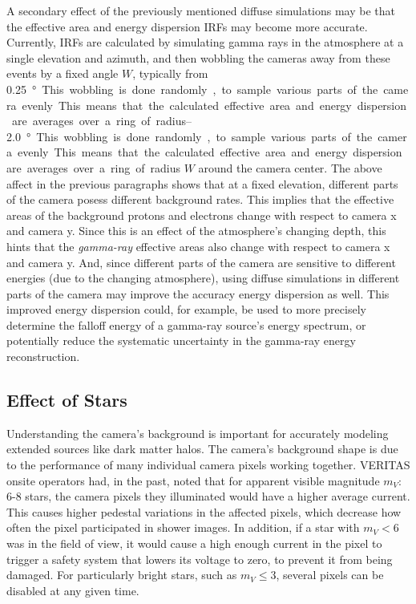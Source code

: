     A secondary effect of the previously mentioned diffuse simulations may be that the effective area and energy dispersion IRFs may become more accurate.
    Currently, IRFs are calculated by simulating gamma rays in the atmosphere at a single elevation and azimuth, and then wobbling the cameras away from these events by a fixed angle $W$, typically from \SIrange{0.25}{2.0}\degree.
    This wobbling is done randomly, to sample various parts of the camera evenly.
    This means that the calculated effective area and energy dispersion are averages over a ring of radius $W$ around the camera center.
    The above affect in the previous paragraphs shows that at a fixed elevation, different parts of the camera posess different background rates.
    This implies that the effective areas of the background protons and electrons change with respect to camera x and camera y.
    Since this is an effect of the atmosphere's changing depth, this hints that the \textit{gamma-ray} effective areas also change with respect to camera x and camera y.
    And, since different parts of the camera are sensitive to different energies (due to the changing atmosphere), using diffuse simulations in different parts of the camera may improve the accuracy energy dispersion as well.
    This improved energy dispersion could, for example, be used to more precisely determine the falloff energy of a gamma-ray source's energy spectrum, or potentially reduce the systematic uncertainty in the gamma-ray energy reconstruction.
  
  
  \FloatBarrier

  \subsection{Effect of Stars}
    Understanding the camera's background is important for accurately modeling extended sources like dark matter halos.
    The camera's background shape is due to the performance of many individual camera pixels working together.
    VERITAS onsite operators had, in the past, noted that for apparent visible magnitude $m_V :$ 6-8 stars, the camera pixels they illuminated would have a higher average current.
    This causes higher pedestal variations in the affected pixels, which decrease how often the pixel participated in shower images.
    In addition, if a star with $m_V < 6$ was in the field of view, it would cause a high enough current in the pixel to trigger a safety system that lowers its voltage to zero, to prevent it from being damaged.
    For particularly bright stars, such as $m_V \leq 3$, several pixels can be disabled at any given time.

